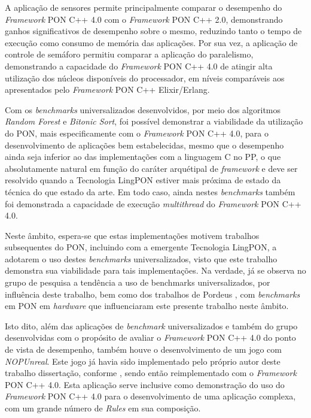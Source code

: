 A aplicação de sensores permite principalmente comparar o desempenho do
\textit{Framework} PON C++ 4.0 com o \textit{Framework} PON C++ 2.0,
demonstrando ganhos significativos de desempenho sobre o mesmo, reduzindo tanto
o tempo de execução como consumo de memória das aplicações. Por sua vez, a
aplicação de controle de semáforo permitiu comparar a aplicação do paralelismo,
demonstrando a capacidade do \textit{Framework} PON C++ 4.0 de atingir alta
utilização dos núcleos disponíveis do processador, em níveis comparáveis aos
apresentados pelo \textit{Framework} PON C++ Elixir/Erlang. 

Com os \textit{benchmarks} universalizados desenvolvidos, por meio dos
algoritmos \textit{Random Forest} e \textit{Bitonic Sort}, foi possível
demonstrar a viabilidade da utilização do PON, mais especificamente com o
\textit{Framework} PON C++ 4.0, para o desenvolvimento de aplicações bem
estabelecidas, mesmo que o desempenho ainda seja inferior ao das implementações
com a linguagem C no PP, o que absolutamente natural em função do caráter
arquétipal de \textit{framework} e deve ser resolvido quando a Tecnologia
LingPON estiver mais próxima de estado da técnica do que estado da arte. Em todo
caso, ainda nestes \textit{benchmarks} também foi demonstrada a capacidade de
execução \textit{multithread} do \textit{Framework} PON C++ 4.0. 

Neste âmbito, espera-se que estas implementações motivem trabalhos subsequentes
do PON, incluindo com a emergente Tecnologia LingPON, a adotarem o uso destes
\textit{benchmarks} universalizados, visto que este trabalho demonstra sua
viabilidade para tais implementações. Na verdade, já se observa no grupo de
pesquisa a tendência a uso de benchmarks universalizados, por influência deste
trabalho, bem como dos trabalhos de Pordeus
\cite{quali_pordeus_2020,pordeus_2020,pordeus_2021}, com \textit{benchmarks} em PON em
\textit{hardware} que influenciaram este presente trabalho neste âmbito.

Isto dito, além das aplicações de \textit{benchmark} universalizados e também do
grupo desenvolvidas com o propósito de avaliar o \textit{Framework} PON C++ 4.0
do ponto de vista de desempenho, também houve o desenvolvimento de um jogo com
\textit{NOPUnreal}. Este jogo já havia sido implementado pelo próprio autor
deste trabalho dissertação, conforme , sendo então
reimplementado com o \textit{Framework} PON C++ 4.0. Esta aplicação serve
inclusive como demonstração do uso do \textit{Framework} PON C++ 4.0 para o
desenvolvimento de uma aplicação complexa, com um grande número de
\textit{Rules} em sua composição.

